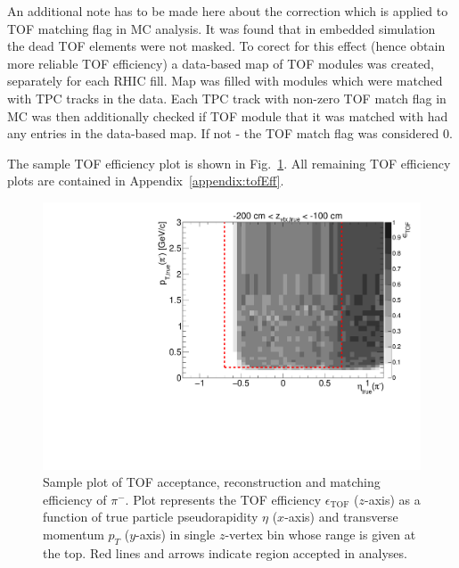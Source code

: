 An additional note has to be made here about the correction which is applied to TOF matching flag in MC analysis. It was found that in embedded simulation the dead TOF elements were not masked. To corect for this effect (hence obtain more reliable TOF efficiency) a data-based map of TOF modules was created, separately for each RHIC fill. Map was filled with modules which were matched with TPC tracks in the data. Each TPC track with non-zero TOF match flag in MC was then additionally checked if TOF module that it was matched with had any entries in the data-based map. If not - the TOF match flag was considered 0.

The sample TOF efficiency plot is shown in Fig.~\ref{fig:tofEff_pion_sample}. All remaining TOF efficiency plots are contained in Appendix~\ref{appendix:tofEff}.

\begin{figure}[hb]%
\centering\includegraphics[width=0.7\linewidth,page=11]{graphics/eff/Eff2D_TOF_pion_Minus.pdf}%
\caption[Sample plot of TOF acceptance, reconstruction and matching efficiency of $\pi^{-}$.]{Sample plot of TOF acceptance, reconstruction and matching efficiency of $\pi^{-}$. Plot represents the TOF efficiency $\epsilon_{\text{TOF}}$ ($z$-axis) as a function of true particle pseudorapidity $\eta$ ($x$-axis) and transverse momentum $p_{T}$ ($y$-axis) in single $z$-vertex bin whose range is given at the top. Red lines and arrows indicate region accepted in analyses.}\label{fig:tofEff_pion_sample}
\end{figure}

% 
% 
